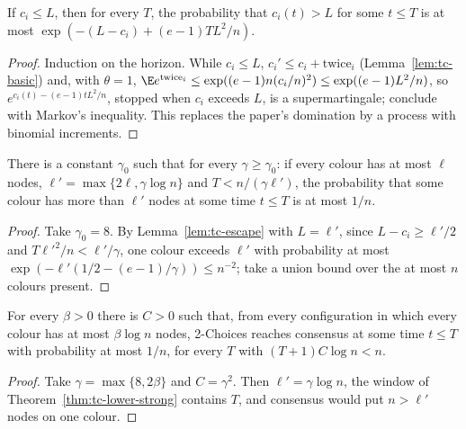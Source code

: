 \begin{lemma}\label{lem:tc-escape}
\leanok{}
If $c_i\le L$, then for every $T$, the probability that $c_i(t)>L$ for some $t\le T$ is at most
$\exp(-(L-c_i)+(e-1)TL^2/n)$.
\end{lemma}
\begin{proof}\leanok
Induction on the horizon. While $c_i\le L$, $c_i'\le c_i+\mathrm{twice}_i$ (Lemma~\ref{lem:tc-basic})
and, with $\theta=1$, $\E e^{\mathrm{twice}_i}\le\exp((e-1)n(c_i/n)^2)\le\exp((e-1)L^2/n)$, so
$e^{c_i(t)-(e-1)tL^2/n}$, stopped when $c_i$ exceeds $L$, is a supermartingale; conclude with
Markov's inequality. This replaces the paper's domination by a process with binomial increments.
\end{proof}

\begin{theorem}[Theorem~5]\label{thm:tc-lower-strong}
\leanok{}
There is a constant $\gamma_0$ such that for every $\gamma\ge\gamma_0$: if every colour has at most
$\ell$ nodes, $\ell'=\max\{2\ell,\gamma\log n\}$ and $T<n/(\gamma\ell')$, the probability that some
colour has more than $\ell'$ nodes at some time $t\le T$ is at most $1/n$.
\end{theorem}
\begin{proof}\leanok
Take $\gamma_0=8$. By Lemma~\ref{lem:tc-escape} with $L=\ell'$, since $L-c_i\ge\ell'/2$ and
$T\ell'^2/n<\ell'/\gamma$, one colour exceeds $\ell'$ with probability at most
$\exp(-\ell'(1/2-(e-1)/\gamma))\le n^{-2}$; take a union bound over the at most $n$ colours
present.
\end{proof}

\begin{theorem}\label{thm:tc-lower}
\leanok{}
For every $\beta>0$ there is $C>0$ such that, from every configuration in which every colour has at
most $\beta\log n$ nodes, 2-Choices reaches consensus at some time $t\le T$ with probability at
most $1/n$, for every $T$ with $(T+1)C\log n<n$.
\end{theorem}
\begin{proof}\leanok
Take $\gamma=\max\{8,2\beta\}$ and $C=\gamma^2$. Then $\ell'=\gamma\log n$, the window of
Theorem~\ref{thm:tc-lower-strong} contains $T$, and consensus would put $n>\ell'$ nodes on one
colour.
\end{proof}
